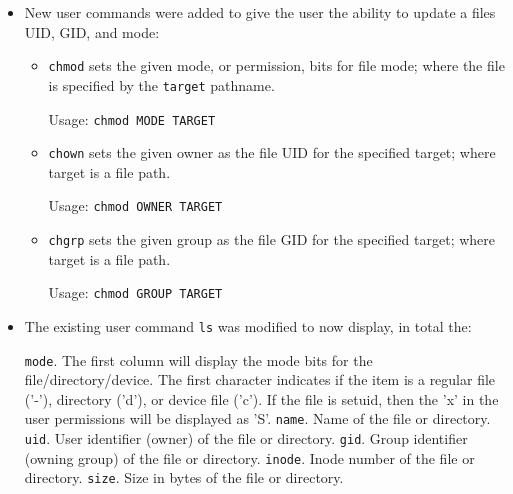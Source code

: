 \documentclass[11pt,letterpaper]{report}
\begin{document}
\begin{itemize}
	
	\item New user commands were added to give the user the ability to update a files UID, GID, and mode:
	
		\begin{itemize}
			\item {\tt chmod} sets the given mode, or permission, bits for file mode; where the file is specified by the {\tt target} pathname.
		
					Usage: {\tt chmod MODE TARGET}
					
			\item {\tt chown} sets the given owner as the file UID for the specified target; where target is a file path.
			
				Usage: {\tt chmod OWNER TARGET}
			\item {\tt chgrp} sets the given group as the file GID for the specified target; where target is a file path.
			
				Usage: {\tt chmod GROUP TARGET}
		\end{itemize}
	



	\item The existing user command {\tt ls} was modified to now display, in total the:
	
\subitem \texttt{mode}. The first column will display the mode bits for the file/directory/device. The first character indicates if the item is a regular file ('-'), directory ('d'), or device file ('c'). If the file is setuid, then the 'x' in the user permissions will be displayed as 'S'.
\subitem \texttt{name}. Name of the file or directory.
\subitem \texttt{uid}. User identifier (owner) of the file or directory.
\subitem \texttt{gid}. Group identifier (owning group) of the file or directory.
\subitem \texttt{inode}. Inode number of the file or directory.
\subitem \texttt{size}. Size in bytes of the file or directory. \\


\end{itemize}
\end{document}
